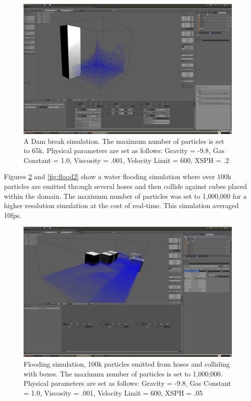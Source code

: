 \begin{figure}[!htc]
		\includegraphics[scale=0.4]{figures/dam_break.png}
        \caption{ A Dam break simulation. The maximum number of particles is set to 65k.
        Physical parameters are set as follows: Gravity = -9.8, Gas
        Constant = 1.0, Viscosity = .001, Velocity Limit = 600, XSPH = .2}
		\label{fig:dam_break}
\end{figure}

\pagebreak
\clearpage

Figures \ref{fig:flood1} and \ref{fig:flood2} show a water flooding simulation where
over 100k particles are emitted through several hoses and then collide against
cubes placed within the domain. The maximum number of particles was set to
1,000,000 for a higher resolution simulation at the cost of real-time. This
simulation averaged 10fps.


\begin{figure}[!htc]
		\includegraphics[scale=0.4]{figures/flood1.png}
        \caption{ Flooding simulation, 100k particles emitted from hoses and
        colliding with boxes. The maximum number of particles is set to
        1,000,000. Physical parameters are set as follows: Gravity = -9.8, Gas
        Constant = 1.0, Viscosity = .001, Velocity Limit = 600, XSPH = .05}
		\label{fig:flood1}
\end{figure}

